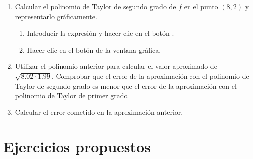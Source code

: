 \begin{enumerate}[leftmargin=*]
\begin{enumerate}
\item Calcular el polinomio de Taylor de segundo grado de $f$ en el punto $(8,2)$ y representarlo gráficamente.
\begin{indicacion}
\begin{enumerate}
\item Introducir la expresión  y hacer clic en el botón .
\item Hacer clic en el botón  de la ventana gráfica.
\end{enumerate}
\end{indicacion}

\item Utilizar el polinomio anterior para calcular el valor aproximado de $\sqrt{8.02\cdot 1.99}$.
Comprobar que el error de la aproximación con el polinomio de Taylor de segundo grado es menor que el error de la aproximación con el polinomio de Taylor de primer grado. 

\item Calcular el error cometido en la aproximación anterior.
\end{enumerate}
\end{enumerate}


\section{Ejercicios propuestos}


